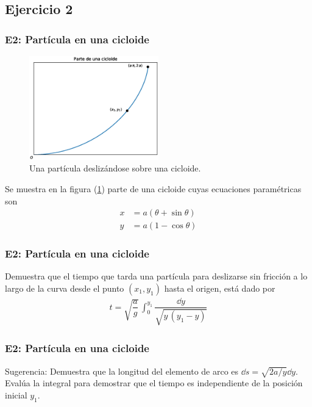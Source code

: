 \subsection{Ejercicio 2}
\begin{frame}
\frametitle{E2: Partícula en una cicloide}
\begin{figure}
    \centering
    \includegraphics[width=0.5\textwidth]{Imagenes/plot_cicloide.eps}
    \caption{Una partícula deslizándose sobre una cicloide.}
    \label{fig:figura_cicloide}
\end{figure}
Se muestra en la figura (\ref{fig:figura_cicloide}) parte de una cicloide cuyas ecuaciones paramétricas son
\begin{align*}
x &= a (\theta + \sin \theta) \\[0.5em]
y &= a (1 - \cos \theta)
\end{align*}
\end{frame}
\begin{frame}
\frametitle{E2: Partícula en una cicloide}
Demuestra que el tiempo que tarda una partícula para deslizarse sin fricción a lo largo de la curva desde el punto $(x_{1}, y_{1})$ hasta el origen, está dado por
\begin{align*}
t = \sqrt{\dfrac{a}{g}} \, \int_{0}^{y_{1}} \dfrac{\dd{y}}{\sqrt{y \, (y_{1}- y)}}
\end{align*}
\end{frame}
\begin{frame}
\frametitle{E2: Partícula en una cicloide}
Sugerencia: Demuestra que la longitud del elemento de arco es $\dd{s} = \sqrt{2a/y} \dd{y}$.
\\
\bigskip
Evalúa la integral para demostrar que el tiempo es independiente de la posición inicial $y_{1}$.
\end{frame}
 